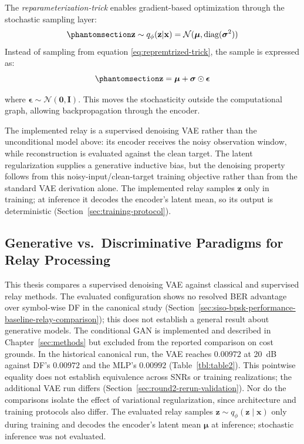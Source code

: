 The \emph{reparameterization-trick} enables gradient-based optimization through the stochastic sampling layer:
\begin{equation}\protect\phantomsection\label{eq:repremtrized-trick}
\mathbf{z} \sim q_\phi(\mathbf{z} | \mathbf{x}) = \mathcal{N}(\boldsymbol{\mu}, \text{diag}(\boldsymbol{\sigma}^2))
\end{equation}
Instead of sampling from equation \ref{eq:repremtrized-trick}, the sample is expressed as:
\begin{equation}\protect\phantomsection\label{eq:repremtrized-trick-resample}
\mathbf{z} = \boldsymbol{\mu} + \boldsymbol{\sigma} \odot \boldsymbol{\epsilon}
\end{equation}

where \(\boldsymbol{\epsilon} \sim \mathcal{N}(\mathbf{0}, \mathbf{I})\).
This moves the stochasticity outside the computational graph, allowing backpropagation through the encoder.

The implemented relay is a supervised denoising VAE rather than the unconditional model above: its encoder receives the noisy observation window, while reconstruction is evaluated against the clean target. The latent regularization supplies a generative inductive bias, but the denoising property follows from this noisy-input/clean-target training objective rather than from the standard VAE derivation alone. The implemented relay samples \(\mathbf{z}\) only in training; at inference it decodes the encoder's latent mean, so its output is deterministic (Section~\ref{sec:training-protocol}).

\subsection{Generative vs.~Discriminative Paradigms for Relay Processing}\label{sec:generative-vs.-discriminative-paradigms-for-relay-processing}

This thesis compares a supervised denoising VAE against classical and supervised relay methods. The evaluated configuration shows no resolved BER advantage over symbol-wise DF in the canonical study (Section~\ref{sec:siso-bpsk-performance-baseline-relay-comparison}); this does not establish a general result about generative models. The conditional GAN is implemented and described in Chapter~\ref{sec:methods} but excluded from the reported comparison on cost grounds. In the historical canonical run, the VAE reaches $0.00972$ at 20~dB against DF's $0.00972$ and the MLP's $0.00992$ (Table~\ref{tbl:table2}). This pointwise equality does not establish equivalence across SNRs or training realizations; the additional VAE run differs (Section~\ref{sec:round2-rerun-validation}). Nor do the comparisons isolate the effect of variational regularization, since architecture and training protocols also differ. The evaluated relay samples $\mathbf{z}\sim q_\phi(\mathbf{z}\mid\mathbf{x})$ only during training and decodes the encoder's latent mean $\boldsymbol{\mu}$ at inference; stochastic inference was not evaluated.

